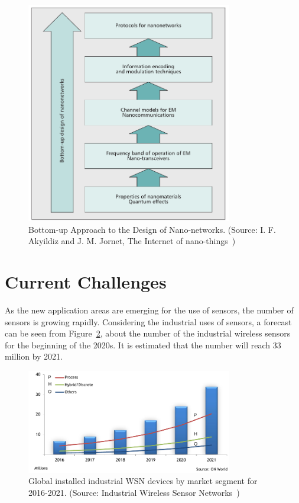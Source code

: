 \documentclass[12pt, oneandhalf, chaparabic, sees, ms]{metu}
\begin{document}
% 
%
%
\begin{figure}[!htbp]
\begin{center}
\includegraphics[width=0.8\textwidth]{design2.png}
  \end{center}
  \caption{Bottom-up Approach to the Design of Nano-networks. (Source: I. F. Akyildiz and J. M. Jornet, The Internet of nano-things~\protect\cite{akyildiz2010-1})}
 \label{fig:design}
\end{figure}
% 
%
%


\newpage
\section{Current Challenges}\label{scurrchal} 
As the new application areas are emerging for the use of sensors, the number of sensors is growing rapidly. 
Considering the industrial uses of sensors, a forecast can be seen from Figure~\ref{fig:forecast-wsn}, about 
the number of the industrial wireless sensors for the beginning of the 2020s. It is estimated that the number will reach 33 million by 2021.
% 
%
% 
\begin{figure}[!htbp]
\begin{center}
  \includegraphics[width=0.8\textwidth]{global-wsn-devices2.png}
   \end{center}
  \caption{Global installed industrial WSN devices by market segment for 2016-2021. (Source: Industrial Wireless Sensor Networks~\protect\cite{ONworld2017})}
 \label{fig:forecast-wsn}
\end{figure}
% 
%
%
\end{document}
